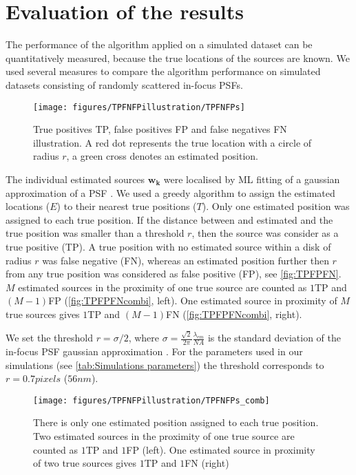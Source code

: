 
\clearpage
\section{Evaluation of the results\label{sec:evaluation}}

The performance of the algorithm applied on a simulated dataset can be quantitatively measured, because the true locations of the sources are known. We used several measures to compare the algorithm performance on simulated datasets consisting of randomly scattered in-focus PSFs. 

\begin{figure}[!h]
	\centering
	\texttt{[image: figures/TPFNFPillustration/TPFNFPs]}
	\caption{True positives TP, false positives FP and false negatives FN illustration. A red dot represents the true location with a circle of radius $r$, a green cross denotes an estimated position.}
	\label{fig:TPFPFN}
\end{figure}

The individual estimated sources $\bm{w_{k}}$ were localised by ML fitting of a gaussian approximation of a PSF \cite{Zhang2007}. We used a greedy algorithm to assign the estimated locations ($E$) to their nearest true positions ($T$). Only one estimated position was assigned to each true position. If the distance between and estimated and the true position was smaller than a threshold $r$, then the source was consider as a true positive (TP). A true position with no estimated source within a disk of radius $r$ was false negative (FN), whereas an estimated position further then $r$ from any true position was considered as false positive (FP), see \autoref{fig:TPFPFN}. $M$ estimated sources in the proximity of one true source are counted as $1$TP and $(M-1)$FP (\autoref{fig:TPFPFNcombi}, left). One estimated source in proximity of $M$ true sources gives $1$TP and $(M-1)$FN (\autoref{fig:TPFPFNcombi}, right).

We set the threshold $r=\sigma/2$, where $\sigma=\frac{\sqrt{2}}{2\pi}\frac{\lambda_{em}}{NA}$ is the standard deviation of the in-focus PSF gaussian approximation \cite{Zhang2007}. For the parameters used in our simulations (see \autoref{tab:Simulations parameters}) the threshold corresponds to $r=0.7\unit{pixels}$ ($56\unit{nm}$). 

\begin{figure}[!h]
	\centering
	\texttt{[image: figures/TPFNFPillustration/TPFNFPs\_comb]}
	\caption{There is only one estimated position assigned to each true position. Two estimated sources in the proximity of one true source are counted as $1$TP and $1$FP (left). One estimated source in proximity of two true sources gives $1$TP and $1$FN (right)}
	\label{fig:TPFPFNcombi}
\end{figure}

